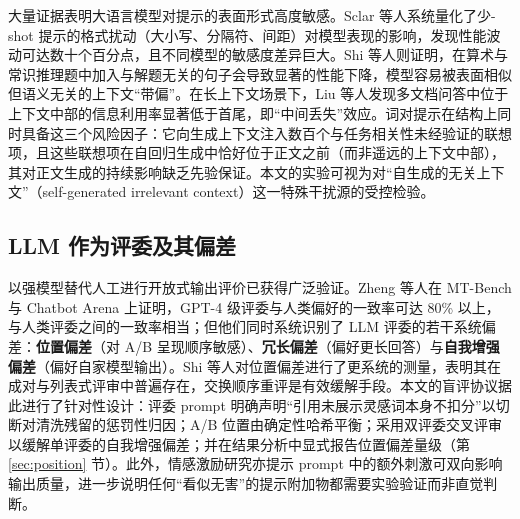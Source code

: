 大量证据表明大语言模型对提示的表面形式高度敏感。Sclar 等人系统量化了少-shot 提示的格式扰动（大小写、分隔符、间距）对模型表现的影响，发现性能波动可达数十个百分点，且不同模型的敏感度差异巨大\cite{sclar2024format}。Shi 等人则证明，在算术与常识推理题中加入与解题无关的句子会导致显著的性能下降，模型容易被表面相似但语义无关的上下文“带偏”\cite{shi2023distracted}。在长上下文场景下，Liu 等人发现多文档问答中位于上下文中部的信息利用率显著低于首尾，即“中间丢失”效应\cite{liu2024lost}。词对提示在结构上同时具备这三个风险因子：它向生成上下文注入数百个与任务相关性未经验证的联想项，且这些联想项在自回归生成中恰好位于正文之前（而非遥远的上下文中部），其对正文生成的持续影响缺乏先验保证。本文的实验可视为对“自生成的无关上下文”（self-generated irrelevant context）这一特殊干扰源的受控检验。

\subsection{LLM 作为评委及其偏差}

以强模型替代人工进行开放式输出评价已获得广泛验证。Zheng 等人在 MT-Bench 与 Chatbot Arena 上证明，GPT-4 级评委与人类偏好的一致率可达 80\% 以上，与人类评委之间的一致率相当\cite{zheng2023judging}；但他们同时系统识别了 LLM 评委的若干系统偏差：\textbf{位置偏差}（对 A/B 呈现顺序敏感）、\textbf{冗长偏差}（偏好更长回答）与\textbf{自我增强偏差}（偏好自家模型输出）。Shi 等人对位置偏差进行了更系统的测量，表明其在成对与列表式评审中普遍存在，交换顺序重评是有效缓解手段\cite{shi2025position}。本文的盲评协议据此进行了针对性设计：评委 prompt 明确声明“引用未展示灵感词本身不扣分”以切断对清洗残留的惩罚性归因；A/B 位置由确定性哈希平衡；采用双评委交叉评审以缓解单评委的自我增强偏差；并在结果分析中显式报告位置偏差量级（第 \ref{sec:position} 节）。此外，情感激励研究亦提示 prompt 中的额外刺激可双向影响输出质量\cite{li2023emotion}，进一步说明任何“看似无害”的提示附加物都需要实验验证而非直觉判断。
